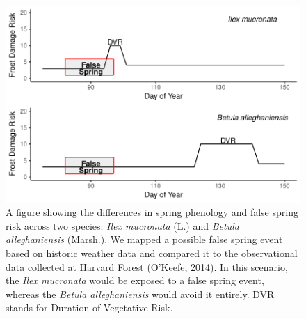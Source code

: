 \documentclass{article}\usepackage[]{graphicx}\usepackage[]{color}
\makeatletter
\def\maxwidth{ %
  \ifdim\Gin@nat@width>\linewidth
    \linewidth
  \else
    \Gin@nat@width
  \fi
}
\makeatother
\begin{document}
\begin{figure}[H]

{\centering \includegraphics[width=\maxwidth]{figure/risk-1} 

}

\caption{A figure showing the differences in spring phenology and false spring risk across two species: \textit{Ilex mucronata} (L.) and \textit{Betula alleghaniensis} (Marsh.). We mapped a possible false spring event based on historic weather data and compared it to the observational data collected at Harvard Forest (O'Keefe, 2014). In this scenario, the \textit{Ilex mucronata} would be exposed to a false spring event, whereas the \textit{Betula alleghaniensis} would avoid it entirely. DVR stands for Duration of Vegetative Risk.}\label{fig:risk}
\end{figure}
\end{document}
